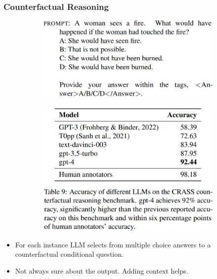 \documentclass{beamer}
\begin{document}
\begin{frame}
	\frametitle{Counterfactual Reasoning}
		\begin{figure}
			\centering
			\begin{subfigure}{0.5\textwidth}
				\includegraphics[scale=0.25]{imgs/counter_promp.png}
			\end{subfigure}%
			\begin{subfigure}{0.5\textwidth}
				\includegraphics[scale=0.2]{imgs/table9.png}
			\end{subfigure}
		\end{figure}
		\begin{itemize}
			\item For each instance LLM selects from multiple choice answers to a counterfactual conditional question.
			\item Not always sure about the output. Adding context helps.
		\end{itemize}
\end{frame}
\end{document}

